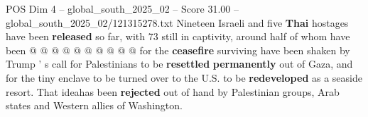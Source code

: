 \begin{textsample}{POS Dim 4 – global\_south\_2025\_02 – Score 31.00 – global\_south\_2025\_02/121315278.txt}
Nineteen Israeli and five \textbf{Thai} hostages have been \textbf{released} so far, with 73 still in captivity, around half of whom have been @ @ @ @ @ @ @ @ @ @ for the \textbf{ceasefire} surviving have been shaken by Trump ' s call for Palestinians to be \textbf{resettled} \textbf{permanently} out of Gaza, and for the tiny enclave to be turned over to the U.S. to be \textbf{redeveloped} as a seaside resort.
That ideahas been \textbf{rejected} out of hand by Palestinian groups, Arab states and Western allies of Washington.

\end{textsample}
